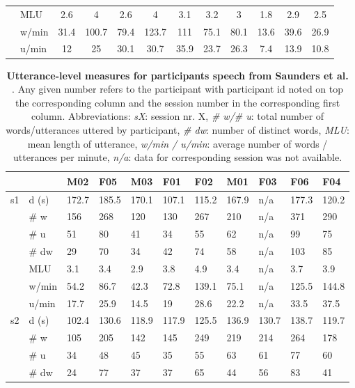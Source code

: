 \begin{screenonly}
\begin{table*}[h]
\begin{tabular*}{\hsize}{@{\extracolsep{\fill}}clcccccccccc}
    & MLU & 2.6 & 4 & 2.6 & 4 & 3.1 & 3.2 & 3 & 1.8 & 2.9 & 2.5\\
    & w/min & 31.4 & 100.7 & 79.4 & 123.7 & 111 & 75.1 & 80.1 & 13.6 & 39.6 & 26.9\\
    & u/min & 12 & 25 & 30.1 & 30.7 & 35.9 & 23.7 & 26.3 & 7.4 & 13.9 & 10.8\\
    \bottomrule
  \end{tabular*}
\end{table*}
\begin{table*}[h]
  \caption{\textbf{Utterance-level measures for participants speech from Saunders et al. \cite{Saunders2012}}. Any given number refers to the participant
    with participant id noted on top the corresponding column and the session number in the corresponding first column. Abbreviations: \textsl{sX}:
    session nr. X, \textsl{\# w/\# u}: total number of words/utterances uttered by participant, \textsl{\# dw}: number of distinct words,
    \textsl{MLU}: mean length of utterance, \textsl{w/min / u/min}: average number of words / utterances per minute, \textsl{n/a}: data for
    corresponding session was not available.}
  \begin{tabular*}{\hsize}{@{\extracolsep{\fill}}lllllllllll}
    \toprule
    & & M02 & F05 & M03 & F01 & F02 & M01 & F03 & F06 & F04 \\
    \midrule
    \multirow{7}{*}{s1} & d (s) & 172.7 & 185.5 & 170.1 & 107.1 & 115.2 & 167.9 & n/a & 177.3 & 120.2 \\
    & \# w & 156 & 268 & 120 & 130 & 267 & 210 & n/a & 371 & 290 \\
    & \# u & 51 & 80 & 41 & 34 & 55 & 62 & n/a & 99 & 75 \\
    & \# dw & 29 & 70 & 34 & 42 & 74 & 58 & n/a & 103 & 85 \\
    & MLU & 3.1 & 3.4 & 2.9 & 3.8 & 4.9 & 3.4 & n/a & 3.7 & 3.9 \\
    & w/min & 54.2 & 86.7 & 42.3 & 72.8 & 139.1 & 75.1 & n/a & 125.5 & 144.8 \\
    & u/min & 17.7 & 25.9 & 14.5 & 19 & 28.6 & 22.2 & n/a & 33.5 & 37.5 \\
    \cmidrule{2-11}
    \multirow{7}{*}{s2} & d (s) & 102.4 & 130.6 & 118.9 & 117.9 & 125.5 & 136.9 & 130.7 & 138.7 & 119.7 \\
    & \# w & 105 & 205 & 142 & 145 & 249 & 219 & 214 & 264 & 178 \\
    & \# u & 34 & 48 & 45 & 35 & 55 & 63 & 61 & 77 & 60 \\
    & \# dw & 24 & 77 & 37 & 37 & 65 & 44 & 56 & 83 & 41 \\

\end{tabular*}
\end{table*}
\end{screenonly}
